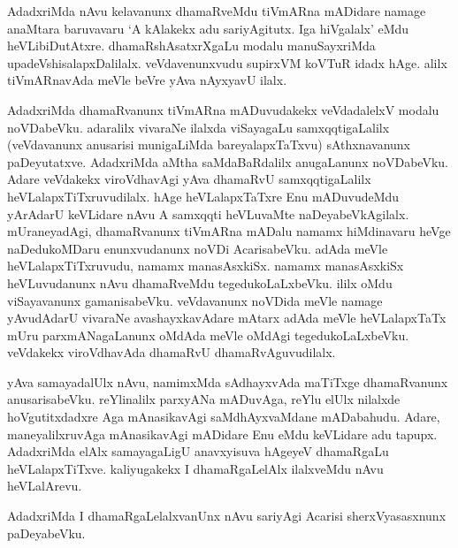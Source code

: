 AdadxriMda nAvu kelavanunx dhamaRveMdu tiVmARna mADidare namage anaMtara baruvavaru `A kAlakekx adu sariyAgitutx. Iga hiVgalalx' eMdu heVLibiDutAtxre. dhamaRshAsatxrXgaLu modalu manuSayxriMda upadeVshisalapxDalilalx. veVdavenunxvudu supirxVM koVTuR idadx hAge. alilx tiVmARnavAda meVle beVre yAva nAyxyavU ilalx.

AdadxriMda dhamaRvanunx tiVmARna mADuvudakekx veVdadalelxV modalu noVDabeVku. adaralilx vivaraNe ilalxda viSayagaLu samxqqtigaLalilx (veVdavanunx anusarisi munigaLiMda bareyalapxTaTxvu) sAthxnavanunx paDeyutatxve. AdadxriMda aMtha saMdaBaRdalilx anugaLanunx noVDabeVku. Adare veVdakekx viroVdhavAgi yAva dhamaRvU samxqqtigaLalilx heVLalapxTiTxruvudilalx. hAge heVLalapxTaTxre Enu mADuvudeMdu yArAdarU keVLidare nAvu A samxqqti heVLuvaMte naDeyabeVkAgilalx. mUraneyadAgi, dhamaRvanunx tiVmARna mADalu namamx hiMdinavaru heVge naDedukoMDaru enunxvudanunx noVDi AcarisabeVku. adAda meVle heVLalapxTiTxruvudu, namamx manasAsxkiSx. namamx manasAsxkiSx heVLuvudanunx nAvu dhamaRveMdu tegedukoLaLxbeVku. ililx oMdu viSayavanunx gamanisabeVku. veVdavanunx noVDida meVle namage yAvudAdarU vivaraNe avashayxkavAdare mAtarx adAda meVle heVLalapxTaTx mUru parxmANagaLanunx oMdAda meVle oMdAgi tegedukoLaLxbeVku. veVdakekx viroVdhavAda dhamaRvU dhamaRvAguvudilalx.

 yAva samayadalUlx nAvu, namimxMda sAdhayxvAda maTiTxge dhamaRvanunx anusarisabeVku. reYlinalilx parxyANa mADuvAga, reYlu elUlx nilalxde hoVgutitxdadxre Aga mAnasikavAgi saMdhAyxvaMdane mADabahudu. Adare, maneyalilxruvAga mAnasikavAgi mADidare Enu eMdu keVLidare adu tapupx. AdadxriMda elAlx samayagaLigU anavxyisuva hAgeyeV dhamaRgaLu heVLalapxTiTxve. kaliyugakekx I dhamaRgaLelAlx ilalxveMdu nAvu heVLalArevu.

AdadxriMda I dhamaRgaLelalxvanUnx nAvu sariyAgi Acarisi sherxVyasasxnunx paDeyabeVku.


\endchapter
